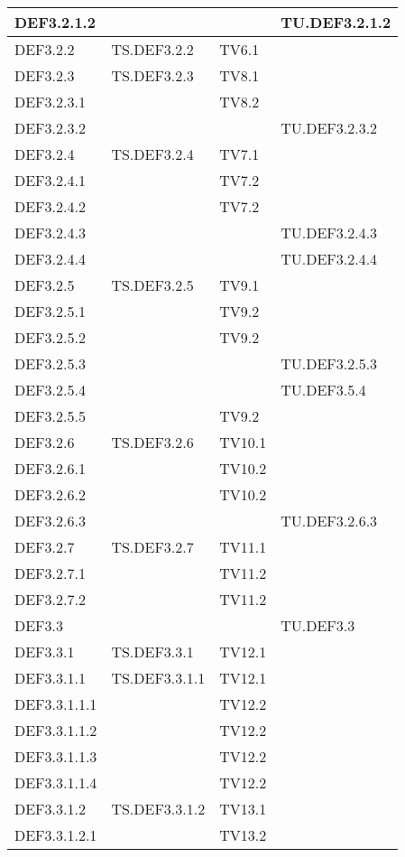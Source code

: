 \documentclass{scalatekids-article}
\begin{document}
\begin{longtable}[H]{|l|p{4cm}|p{4cm}|p{4cm}|}
  \hline
  DEF3.2.1.2 & & & TU.DEF3.2.1.2\\
  \hline
  DEF3.2.2 & TS.DEF3.2.2 & TV6.1 &\\
  \hline
  DEF3.2.3 & TS.DEF3.2.3 & TV8.1 &\\
  \hline
  DEF3.2.3.1 & & TV8.2 &\\
  \hline
  DEF3.2.3.2 & & & TU.DEF3.2.3.2\\
  \hline
  DEF3.2.4 & TS.DEF3.2.4 & TV7.1 &\\
  \hline
  DEF3.2.4.1 & & TV7.2 &\\
  \hline
  DEF3.2.4.2 & & TV7.2 &\\
  \hline
  DEF3.2.4.3 & & & TU.DEF3.2.4.3\\
  \hline
  DEF3.2.4.4 & & & TU.DEF3.2.4.4\\
  \hline
  DEF3.2.5 & TS.DEF3.2.5 & TV9.1 &\\
  \hline
  DEF3.2.5.1 & & TV9.2 &\\
  \hline
  DEF3.2.5.2 & & TV9.2 &\\
  \hline
  DEF3.2.5.3 & & & TU.DEF3.2.5.3\\
  \hline
  DEF3.2.5.4 & & & TU.DEF3.5.4\\
  \hline
  DEF3.2.5.5 & & TV9.2 &\\
  \hline
  DEF3.2.6 & TS.DEF3.2.6 & TV10.1 &\\
  \hline
  DEF3.2.6.1 & & TV10.2 &\\
  \hline
  DEF3.2.6.2 & & TV10.2 &\\
  \hline
  DEF3.2.6.3 & & & TU.DEF3.2.6.3\\
  \hline
  DEF3.2.7 & TS.DEF3.2.7 & TV11.1 &\\
  \hline
  DEF3.2.7.1 & & TV11.2 &\\
  \hline
  DEF3.2.7.2 & & TV11.2 &\\
  \hline
  DEF3.3 & & & TU.DEF3.3\\
  \hline
  DEF3.3.1 & TS.DEF3.3.1 & TV12.1 &\\
  \hline
  DEF3.3.1.1 & TS.DEF3.3.1.1 & TV12.1 &\\
  \hline
  DEF3.3.1.1.1 & & TV12.2 &\\
  \hline
  DEF3.3.1.1.2 & & TV12.2 &\\
  \hline
  DEF3.3.1.1.3 & & TV12.2 &\\
  \hline
  DEF3.3.1.1.4 & & TV12.2 &\\
  \hline
  DEF3.3.1.2 & TS.DEF3.3.1.2 & TV13.1 &\\
  \hline
  DEF3.3.1.2.1 & & TV13.2 &\\

\end{longtable}
\end{document}
